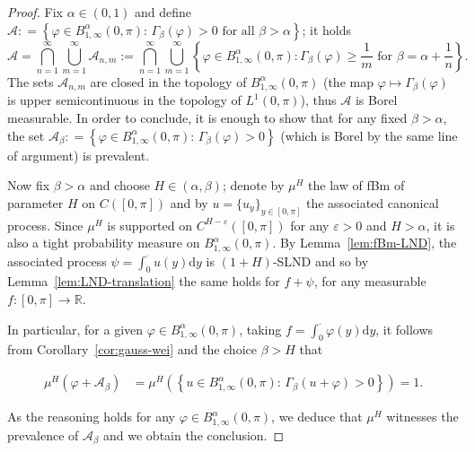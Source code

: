 \documentclass[11pt,oneside,reqno]{amsart}
\newcommand{\assign}{:=}
\newcommand{\mathd}{\mathrm{d}}
\numberwithin{equation}{section}
\begin{document}
\begin{proof}
  Fix $\alpha \in (0, 1)$ and define $\mathcal{A} : = \left\{ \varphi \in
  B^{\alpha}_{1, \infty} (0, \pi) : \, \Gamma_{\beta} (\varphi) > 0 \text{ for
  all } \beta > \alpha \right\}$; it holds
  \[ \mathcal{A} = \bigcap_{n = 1}^{\infty} \bigcup_{m = 1}^{\infty}
     \mathcal{A}_{n, m} \assign \bigcap_{n = 1}^{\infty} \bigcup_{m =
     1}^{\infty} \left\{ \varphi \in B^{\alpha}_{1, \infty} (0, \pi) :
     \Gamma_{\beta} (\varphi) \geqslant \frac{1}{m} \text{ for } \beta =
     \alpha + \frac{1}{n} \right\} . \]
  The sets $\mathcal{A}_{n, m}$ are closed in the topology of $B^{\alpha}_{1,
  \infty} (0, \pi)$ (the map $\varphi \mapsto \Gamma_{\beta} (\varphi)$ is
  upper semicontinuous in the topology of $L^1 (0, \pi)$), thus $\mathcal{A}$
  is Borel measurable. In order to conclude, it is enough to show that for any
  fixed $\beta > \alpha$, the set $\mathcal{A}_{\beta} : = \left\{ \varphi \in
  B^{\alpha}_{1, \infty} (0, \pi) : \, \Gamma_{\beta} (\varphi) > 0 \right\}$
  (which is Borel by the same line of argument) is prevalent.
  
  Now fix $\beta > \alpha$ and choose $H \in (\alpha, \beta)$; denote by
  $\mu^H$ the law of fBm of parameter $H$ on $C ([0, \pi])$ and by $u = \{ u_y
  \}_{y \in [0, \pi]}$ the associated canonical process. Since $\mu^H$ is
  supported on $C^{H - \varepsilon} ([0, \pi])$ for any $\varepsilon > 0$ and
  $H > \alpha$, it is also a tight probability measure on $B^{\alpha}_{1,
  \infty} (0, \pi)$. By Lemma~\ref{lem:fBm-LND}, the associated process $\psi
  = \int_0^{\cdot} u (y) \mathd y$ is $(1 + H)$-SLND and so by
  Lemma~\ref{lem:LND-translation} the same holds for $f + \psi$, for any
  measurable $f : [0, \pi] \rightarrow \mathbb{R}$.
  
  In particular, for a given $\varphi \in B^{\alpha}_{1, \infty} (0, \pi)$,
  taking $f = \int_0^{\cdot} \varphi (y) \mathd y$, it follows from
  Corollary~\ref{cor:gauss-wei} and the choice $\beta > H$ that
  
  \begin{align*}
    \mu^H (\varphi + \mathcal{A}_{\beta}) & = \mu^H \left( \left\{ u \in
    B^{\alpha}_{1, \infty} (0, \pi) : \, \Gamma_{\beta} (u + \varphi) > 0
    \right\} \right) = 1.
  \end{align*}
  
  As the reasoning holds for any $\varphi \in B^{\alpha}_{1, \infty} (0,
  \pi)$, we deduce that $\mu^H$ witnesses the prevalence of
  $\mathcal{A}_{\beta}$ and we obtain the conclusion.
\end{proof}
\end{document}
